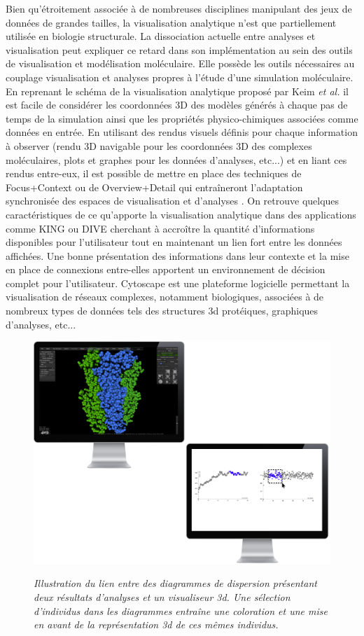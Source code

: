 Bien qu'étroitement associée à de nombreuses disciplines manipulant des jeux de données de grandes tailles, la visualisation analytique n'est que partiellement utilisée en biologie structurale. La dissociation actuelle entre analyses et visualisation peut expliquer ce retard dans son implémentation au sein des outils de visualisation et modélisation moléculaire.
Elle possède les outils nécessaires au couplage visualisation et analyses propres à l'étude d'une simulation moléculaire. En reprenant le schéma de la visualisation analytique proposé par Keim \textit{et al.} il est facile de considérer les coordonnées 3D des modèles générés à chaque pas de temps de la simulation ainsi que les propriétés physico-chimiques associées comme données en entrée. En utilisant des rendus visuels définis pour chaque information à observer (rendu 3D navigable pour les coordonnées 3D des complexes moléculaires, plots et graphes pour les données d'analyses, etc...) et en liant ces rendus entre-eux, il est possible de mettre en place des techniques de Focus+Context ou de Overview+Detail qui entraîneront l'adaptation synchronisée des espaces de visualisation et d'analyses \cite{schulz2011visual,kerren_toward_2012}.
On retrouve quelques caractéristiques de ce qu'apporte la visualisation analytique dans des applications comme KING \cite{chen_king_2009} ou DIVE \cite{rysavy_dive:_2014} cherchant à accroître la quantité d'informations disponibles pour l'utilisateur tout en maintenant un lien fort entre les données affichées. Une bonne présentation des informations dans leur contexte et la mise en place de connexions entre-elles apportent un environnement de décision complet pour l'utilisateur. Cytoscape \cite{shannon_cytoscape:_2003,doncheva_topological_2012} est une plateforme logicielle permettant la visualisation de réseaux complexes, notamment biologiques, associées à de nombreux types de données tels des structures 3d protéiques, graphiques d'analyses, etc...

\begin{figure}
  \centering
  {\includegraphics[width=.75\linewidth]{./figures/ch4/ch4_visu2d_visu3d_link.pdf}}
    \caption{\it Illustration du lien entre des diagrammes de dispersion présentant deux résultats d'analyses et un visualiseur 3d. Une sélection d'individus dans les diagrammes entraîne une coloration et une mise en avant de la représentation 3d de ces mêmes individus.}
  \label{Fig:bilateral_selection}
  \hspace{0.3cm}
\end{figure}

